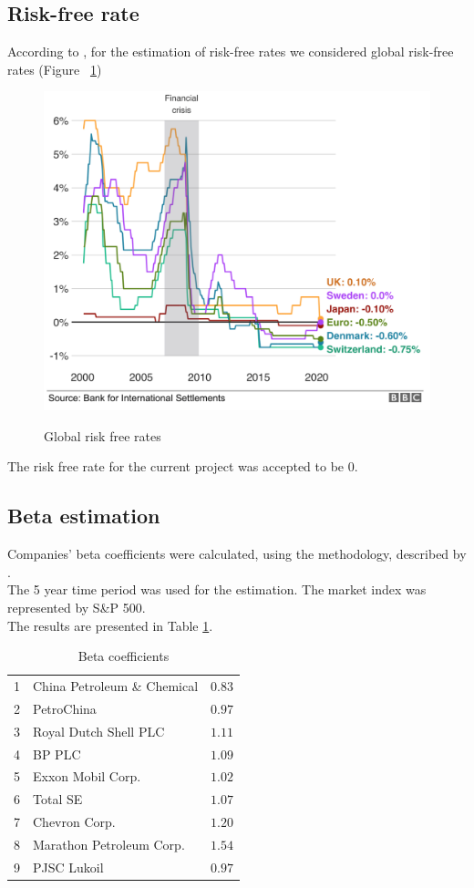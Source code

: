 \documentclass [a4paper, 11pt] {article}
\begin{document}
\subsection {Risk-free rate}

According to \cite{Anderson}, for the estimation of risk-free rates we considered global risk-free rates (Figure ~\ref{fig:rf})

\begin{figure}[!tbp]
\caption{Global risk free rates}
\includegraphics[scale=0.25]{risk_free}
\label{fig:rf}
\end{figure}

The risk free rate for the current project was accepted to be 0.

\clearpage
\subsection {Beta estimation}

Companies' beta coefficients were calculated, using the methodology, described by \cite{Casey}.\\
The 5 year time period was used for the estimation. The market index was represented by S\&P 500.\\
The results are presented in Table \ref{tab:beta}.\\

\begin{table}[!h]
\caption{Beta coefficients\label{beta}} 
\begin{center}
\begin{tabular}{llr}
\hline\hline
1&China Petroleum \& Chemical&$0.83$\tabularnewline
2&PetroChina&$0.97$\tabularnewline
3&Royal Dutch Shell PLC&$1.11$\tabularnewline
4&BP PLC&$1.09$\tabularnewline
5&Exxon Mobil Corp.&$1.02$\tabularnewline
6&Total SE&$1.07$\tabularnewline
7&Chevron Corp.&$1.20$\tabularnewline
8&Marathon Petroleum Corp.&$1.54$\tabularnewline
9&PJSC Lukoil&$0.97$\tabularnewline
\hline
\end{tabular}\end{center}
\label{tab:beta}
\end{table}
\end{document}
